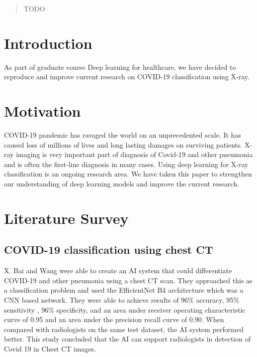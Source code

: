 \documentclass{sigkddExp}
\begin{document}
\date{30 July 1999}
\maketitle
\begin{abstract}
TODO
\end{abstract}

\section{Introduction}
As part of graduate course Deep learning for healthcare, we
have decided to reproduce and improve current research on COVID-19 classification using
X-ray.


\section{Motivation}
COVID-19 pandemic has ravaged the world on an unprecedented scale. It has caused loss
of millions of lives and long lasting damages on surviving patients. X-ray imaging
is very important part of diagnosis of Covid-19 and other pneumonia and is often the
first-line diagnosis in many cases. Using deep learning for X-ray classification is
an ongoing research area. We have taken this paper to strengthen our understanding of
deep learning models and improve the current research.


\section{Literature Survey}

\subsection{COVID-19 classification using chest CT}\cite{pmid32339081}

X. Bai and Wang were able to create an AI system that could differentiate
COVID-19 and other pneumonia using a chest CT scan. They approached this
as a classification problem and used the EfficientNet B4 architecture which
was a CNN based network. They were able to achieve results of 96\% accuracy,
95\% sensitivity , 96\% specificity, and an area under receiver operating
characteristic curve of 0.95 and an area under the precision recall curve of
0.90. When compared with radiologists on the same test dataset, the AI system
performed better. This study concluded that the AI can support radiologists
in detection of Covid 19 in Chest CT images.
\end{document}
